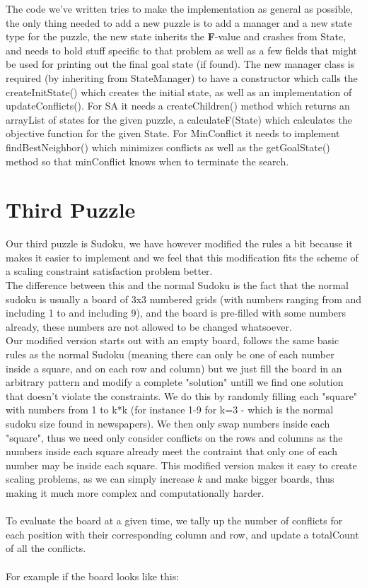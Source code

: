\documentclass[12pt, a4paper]{article}
\begin{document}
The code we've written tries to make the implementation as general as possible, the only thing needed to add a new puzzle is to add a manager and a new state type for the puzzle, the new state inherits the \textbf{F}-value and crashes from State, and needs to hold stuff specific to that problem as well as a few fields that might be used for printing out the final goal state (if found). The new manager class is required (by inheriting from StateManager) to have a constructor which calls the createInitState() which creates the initial state, as well as an implementation of updateConflicts(). For SA it needs a createChildren() method which returns an arrayList of states for the given puzzle, a calculateF(State) which calculates the objective function for the given State. For MinConflict it needs to implement findBestNeighbor() which minimizes conflicts as well as the getGoalState() method so that minConflict knows when to terminate the search.
\section{Third Puzzle}
Our third puzzle is Sudoku, we have however modified the rules a bit because it makes it easier to implement and we feel that this modification fits the scheme of a scaling constraint satisfaction problem better.\\
The difference between this and the normal Sudoku is the fact that the normal sudoku is usually a board of 3x3 numbered grids (with numbers ranging from and including 1 to and including 9), and the board is pre-filled with some numbers already, these numbers are not allowed to be changed whatsoever.\\
Our modified version starts out with an empty board, follows the same basic rules as the normal Sudoku (meaning there can only be one of each number inside a square, and on each row and column) but we just fill the board in an arbitrary pattern and modify a complete "solution" untill we find one solution that doesn't violate the constraints. We do this by randomly filling each "square" with numbers from 1 to k*k (for instance 1-9 for k=3 - which is the normal sudoku size found in newspapers). We then only swap numbers inside each "square", thus we need only consider conflicts on the rows and columns as the numbers inside each square already meet the contraint that only one of each number may be inside each square. This modified version makes it easy to create scaling problems, as we can simply increase $k$ and make bigger boards, thus making it much more complex and computationally harder.
\\\\
To evaluate the board at a given time, we tally up the number of conflicts for each position with their corresponding column and row, and update a totalCount of all the conflicts.
\\\\
For example if the board looks like this:
\end{document}
